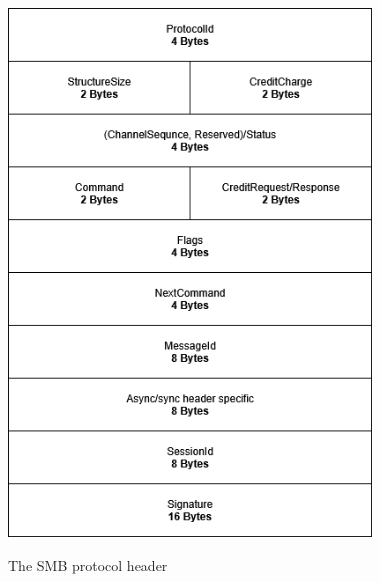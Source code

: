 \documentclass[english, 12pt, a4paper, elec, utf8, a-2b, online]{aaltothesis}
\begin{document}
\begin{figure}[h]
	\centering
	\includegraphics[alt={A block diagram of the SMB2 Packet header common fields format, detailing its fields and their sizes.}, height=14cm]{./images/smb_packet_header_common.png}
	\caption{The SMB protocol header}
	\label{fig:smb2_transport_header}
\end{figure}
\end{document}
